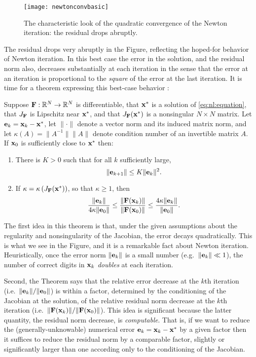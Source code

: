 \begin{figure}
\texttt{[image: newtonconvbasic]}
\caption{The characteristic look of the quadratic convergence of the Newton iteration: the residual drops abruptly.}
\label{fig:newtonconvbasic}
\end{figure}

The residual drops very abruptly in the Figure, reflecting the hoped-for behavior of Newton iteration.  In this best case the error in the solution, and the residual norm also, decreases substantially at each iteration in the sense that the error at an iteration is proportional to the \emph{square} of the error at the last iteration.  It is time for a theorem expressing this best-case behavior \citep[Theorems 1.1 and inequalities (1.13)]{Kelley2003}:

\begin{theorem}
Suppose $\mathbf{F}:\mathbb{R}^N\to\mathbb{R}^N$ is differentiable, that $\mathbf{x}^*$ is a solution of \eqref{eq:nl:equation}, that $J_{\mathbf{F}}$ is Lipschitz near $\mathbf{x}^*$, and that $J_{\mathbf{F}}(\mathbf{x}^*)$ is a nonsingular $N\times N$ matrix.  Let $\mathbf{e}_k=\mathbf{x}_k-\mathbf{x}^*$, let $\|\cdot\|$ denote a vector norm and its induced matrix norm, and let $\kappa(A)=\|A^{-1}\| \|A\|$ denote condition number of an invertible matrix $A$.  If $\mathbf{x}_0$ is sufficiently close to $\mathbf{x}^*$ then:
\renewcommand{\labelenumi}{(\roman{enumi})}
\begin{enumerate}
\item There is $K>0$ such that for all $k$ sufficiently large,
	$$\|\mathbf{e}_{k+1}\| \le K \|\mathbf{e}_k\|^2.$$
\item If $\kappa = \kappa\left(J_{\mathbf{F}}(\mathbf{x}^*)\right)$, so that $\kappa\ge 1$, then
	$$\frac{\|\mathbf{e}_k\|}{4 \kappa \|\mathbf{e}_0\|} \le \frac{\|\mathbf{F}(\mathbf{x}_k)\|}{\|\mathbf{F}(\mathbf{x}_0)\|} \le \frac{4 \kappa \|\mathbf{e}_k\|}{\|\mathbf{e}_0\|}.$$
\end{enumerate}
\end{theorem}

The first idea in this theorem is that, under the given assumptions about the regularity and nonsingularity of the Jacobian, the error decays quadratically.  This is what we see in the Figure, and it is a remarkable fact about Newton iteration.  Heuristically, once the error norm $\|\mathbf{e}_k\|$ is a small number (e.g.~$\|\mathbf{e}_k\| \ll 1$), the number of correct digits in $\mathbf{x}_k$ \emph{doubles} at each iteration.

Second, the Theorem says that the relative error decrease at the $k$th iteration (i.e.~$\|\mathbf{e}_k\|/\|\mathbf{e}_0\|$) is within a factor, determined by the conditioning of the Jacobian at the solution, of the relative residual norm decrease at the $k$th iteration (i.e.~$\|\mathbf{F}(\mathbf{x}_k)\|/\|\mathbf{F}(\mathbf{x}_0)\|$).  This idea is significant because the latter quantity, the residual norm decrease, is \emph{computable}.  That is, if we want to reduce the (generally-unknowable) numerical error $\mathbf{e}_k=\mathbf{x}_k-\mathbf{x}^*$ by a given factor then it suffices to reduce the residual norm by a comparable factor, slightly or significantly larger than one according only to the conditioning of the Jacobian.


